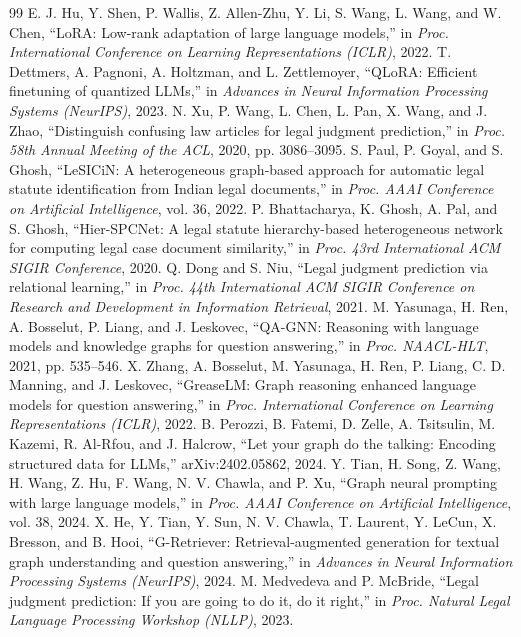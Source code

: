 \begin{thebibliography}{99}
 E. J. Hu, Y. Shen, P. Wallis, Z. Allen-Zhu, Y. Li, S. Wang, L. Wang, and W. Chen, ``LoRA: Low-rank adaptation of large language models,'' in \emph{Proc. International Conference on Learning Representations (ICLR)}, 2022.
 T. Dettmers, A. Pagnoni, A. Holtzman, and L. Zettlemoyer, ``QLoRA: Efficient finetuning of quantized LLMs,'' in \emph{Advances in Neural Information Processing Systems (NeurIPS)}, 2023.
 N. Xu, P. Wang, L. Chen, L. Pan, X. Wang, and J. Zhao, ``Distinguish confusing law articles for legal judgment prediction,'' in \emph{Proc. 58th Annual Meeting of the ACL}, 2020, pp. 3086--3095.
 S. Paul, P. Goyal, and S. Ghosh, ``LeSICiN: A heterogeneous graph-based approach for automatic legal statute identification from Indian legal documents,'' in \emph{Proc. AAAI Conference on Artificial Intelligence}, vol. 36, 2022.
 P. Bhattacharya, K. Ghosh, A. Pal, and S. Ghosh, ``Hier-SPCNet: A legal statute hierarchy-based heterogeneous network for computing legal case document similarity,'' in \emph{Proc. 43rd International ACM SIGIR Conference}, 2020.
 Q. Dong and S. Niu, ``Legal judgment prediction via relational learning,'' in \emph{Proc. 44th International ACM SIGIR Conference on Research and Development in Information Retrieval}, 2021.
 M. Yasunaga, H. Ren, A. Bosselut, P. Liang, and J. Leskovec, ``QA-GNN: Reasoning with language models and knowledge graphs for question answering,'' in \emph{Proc. NAACL-HLT}, 2021, pp. 535--546.
 X. Zhang, A. Bosselut, M. Yasunaga, H. Ren, P. Liang, C. D. Manning, and J. Leskovec, ``GreaseLM: Graph reasoning enhanced language models for question answering,'' in \emph{Proc. International Conference on Learning Representations (ICLR)}, 2022.
 B. Perozzi, B. Fatemi, D. Zelle, A. Tsitsulin, M. Kazemi, R. Al-Rfou, and J. Halcrow, ``Let your graph do the talking: Encoding structured data for LLMs,'' arXiv:2402.05862, 2024.
 Y. Tian, H. Song, Z. Wang, H. Wang, Z. Hu, F. Wang, N. V. Chawla, and P. Xu, ``Graph neural prompting with large language models,'' in \emph{Proc. AAAI Conference on Artificial Intelligence}, vol. 38, 2024.
 X. He, Y. Tian, Y. Sun, N. V. Chawla, T. Laurent, Y. LeCun, X. Bresson, and B. Hooi, ``G-Retriever: Retrieval-augmented generation for textual graph understanding and question answering,'' in \emph{Advances in Neural Information Processing Systems (NeurIPS)}, 2024.
 M. Medvedeva and P. McBride, ``Legal judgment prediction: If you are going to do it, do it right,'' in \emph{Proc. Natural Legal Language Processing Workshop (NLLP)}, 2023.

\end{thebibliography}
